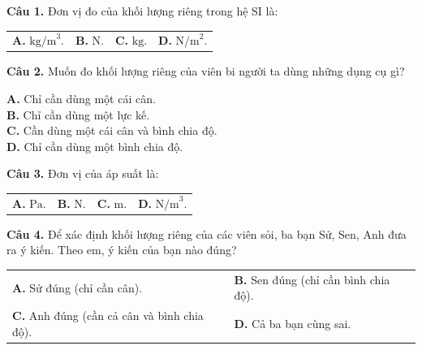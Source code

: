 \documentclass{article}
\begin{document}

\fontsize{26}{34}\selectfont
\textbf{Câu 1.} Đơn vị đo của khối lượng riêng trong hệ SI là:
\vspace{6pt}

\begin{tabularx}{\linewidth}{@{}X X X X@{}}
\textbf{A.} $\text{kg/m}^3$. & \textbf{B.} $\text{N}$. & \textbf{C.} $\text{kg}$. & \textbf{D.} $\text{N/m}^2$.
\end{tabularx}

\vspace*{\fill}

\textbf{Câu 2.} Muốn đo khối lượng riêng của viên bi người ta dùng những dụng cụ gì?
\vspace{6pt}

\textbf{A.} Chỉ cần dùng một cái cân.\\
\textbf{B.} Chỉ cần dùng một lực kế.\\
\textbf{C.} Cần dùng một cái cân và bình chia độ.\\
\textbf{D.} Chỉ cần dùng một bình chia độ.
\vspace*{\fill}
\newpage

\fontsize{25}{33}\selectfont
\textbf{Câu 3.} Đơn vị của áp suất là:
\vspace{6pt}

\begin{tabularx}{\linewidth}{@{}X X X X@{}}
\textbf{A.} $\text{Pa}$. & \textbf{B.} $\text{N}$. & \textbf{C.} $\text{m}$. & \textbf{D.} $\text{N/m}^3$.
\end{tabularx}

\vspace*{\fill}

\textbf{Câu 4.} Để xác định khối lượng riêng của các viên sỏi, ba bạn Sử, Sen, Anh đưa ra ý kiến. Theo em, ý kiến của bạn nào đúng?
\vspace{6pt}

\begin{tabularx}{\linewidth}{@{}X X@{}}
\textbf{A.} Sử đúng (chỉ cần cân). & \textbf{B.} Sen đúng (chỉ cần bình chia độ).\\[8pt]
\textbf{C.} Anh đúng (cần cả cân và bình chia độ). & \textbf{D.} Cả ba bạn cùng sai.
\end{tabularx}
\vspace*{\fill}
\newpage
\end{document}
